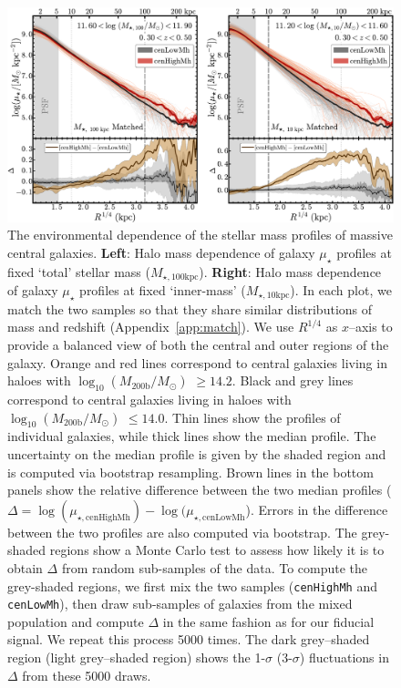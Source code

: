 \documentclass[a4paper,fleqn,usenatbib]{mnras}
\def\rbcg{\texttt{cenHighMh}}
\def\nbcg{\texttt{cenLowMh}}
\def\logmh{{$\log_{10} (M_{\mathrm{200b}}/M_{\odot})$}}
\def\minn{{$M_{\star,10\mathrm{kpc}}$}}
\def\mtot{{$M_{\star,100\mathrm{kpc}}$}}
\def\mden{{$\mu_{\star}$}}
\begin{document}
   
  \begin{figure}
      \centering 
      \includegraphics[width=\textwidth]{fig/redbcg_prof_1}
      \caption{
          The environmental dependence of the stellar mass profiles of massive central 
          galaxies. 
          \textbf{Left}: Halo mass dependence of galaxy \mden{} profiles at fixed 
          `total' stellar mass (\mtot{}). 
          \textbf{Right}: Halo mass dependence of galaxy \mden{} profiles at fixed 
          `inner-mass' (\minn{}). 
          In each plot, we match the two samples so that they share similar 
          distributions of mass and redshift (Appendix~\ref{app:match}).
          We use $R^{1/4}$ as $x$--axis to provide a balanced view of both the central 
          and outer regions of the galaxy.
          Orange and red lines correspond to central galaxies living in 
          haloes with \logmh{} $\geq 14.2$. 
          Black and grey lines correspond to central galaxies living in haloes with 
          \logmh{} $\leq 14.0$. 
          Thin lines show the profiles of individual galaxies, while thick lines show 
          the median profile. 
          The uncertainty on the median profile is given by the shaded region and is 
          computed via bootstrap resampling. 
          Brown lines in the bottom panels show the relative difference between  
          the two median profiles 
          ($\Delta = \log(\mu_{\star, \mathrm{cenHighMh}}) - 
          \log(\mu_{\star, \mathrm{cenLowMh}}$). 
          Errors in the difference between the two profiles are also computed 
          via bootstrap.
          The grey-shaded regions show a Monte Carlo test to assess how likely it is to 
          obtain $\Delta$ from random sub-samples of the data. 
          To compute the grey-shaded regions, we first mix the two samples 
          (\rbcg{} and \nbcg{}), then draw sub-samples of galaxies from the mixed 
          population and compute $\Delta$ in the same fashion as for our fiducial 
          signal. 
          We repeat this process 5000 times.  
          The dark grey--shaded region (light grey--shaded region) shows the 1-$\sigma$ 
          (3-$\sigma$) fluctuations in $\Delta$ from these 5000 draws.
          }
      \label{fig:prof_1} 
  \end{figure}
\end{document}
